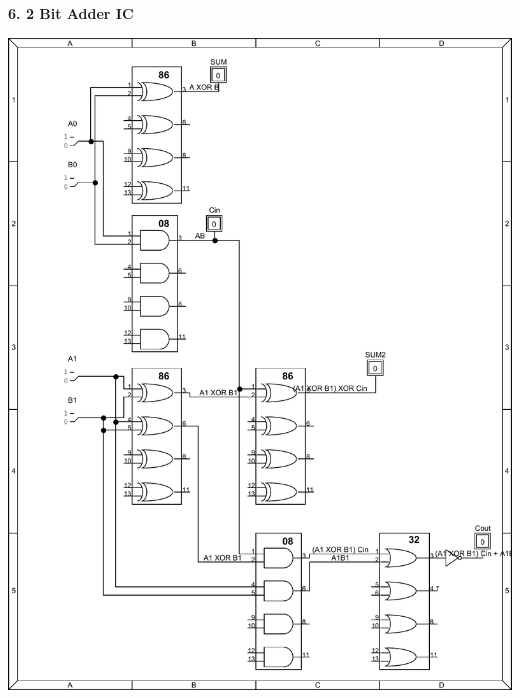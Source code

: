 \documentclass[12pt]{article}
\begin{document}
    \bf{6.} 2 Bit Adder IC

        \includegraphics[scale=.5]{2bitadderpdfic}
\end{document}
